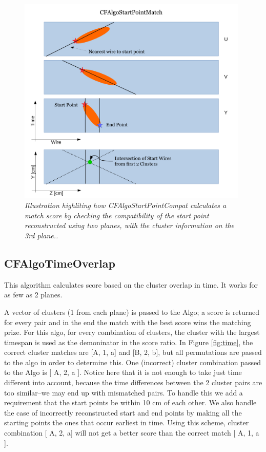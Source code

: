 \documentclass{article}
\begin{document}
\begin{figure}[!h]
\begin{center}
\includegraphics[width=110mm]{Figures/MatchAglo_CFAlgoStartPointCompat_Description.pdf}
\end{center}
\caption{\textit{Illustration highliting how CFAlgoStartPointCompat calculates a match score by checking the compatibility of the start point
reconstructed using two planes, with the cluster information on the 3rd plane..}}
\label{fig:StartPointCompat.}
\end{figure}

\newpage

\subsection{CFAlgoTimeOverlap}
This algorithm calculates score based on the cluster overlap in time. It works for as few as 2 planes.
\par A vector of clusters (1 from each plane) is passed to the Algo; a score is returned for every pair and in the end the match with the best score wins the matching prize.  For this algo, for every combination of clusters, the cluster with the largest timespan is used as the demoninator in the score ratio. In Figure \ref{fig:time}, the correct cluster matches are [A, 1, a] and [B, 2, b], but all permutations are passed to the algo in order to determine this.  One (incorrect) cluster combination passed to the Algo is [ A, 2, a ].  Notice here that it is not enough to take just time different into account, because the time differences between the 2 cluster pairs are too similar--we may end up with mismatched pairs. To handle this we add a requirement that the start points be within 10 cm of each other. We also handle the case of incorrectly reconstructed start and end points by making all the starting points the ones that occur earliest in time. Using this scheme, cluster combination [ A, 2, a] will not get a better score than the correct match [ A, 1, a ].
\end{document}
